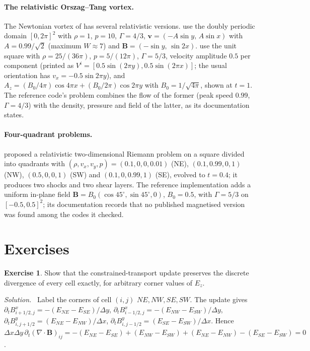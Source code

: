 \documentclass[11pt,a4paper,oneside,openany]{book}
\newcommand{\textcite}{\citet}
\theoremstyle{definition}
\newtheorem{exercise}{Exercise}[chapter]
\theoremstyle{plain}
\theoremstyle{remark}
\newenvironment{solution}{\par\smallskip\noindent\small\textit{Solution.}\ }{\par\medskip}
\newcommand{\vv}{\bm{v}}
\newcommand{\BB}{\bm{B}}
\begin{document}
\paragraph{The relativistic Orszag--Tang vortex.} The Newtonian vortex of
\textcite{OrszagTang1979} has several relativistic versions.
\textcite{vanderHolst2008} use the doubly periodic domain $[0,2\pi]^2$ with $\rho=1$,
$p=10$, $\Gamma=4/3$, $\vv=(-A\sin y,\,A\sin x)$ with $A=0.99/\sqrt2$ (maximum $W\approx7$)
and $\BB=(-\sin y,\,\sin2x)$. \textcite{BeckwithStone2011} use the unit square with
$\rho=25/(36\pi)$, $p=5/(12\pi)$, $\Gamma=5/3$, velocity amplitude $0.5$ per component
(printed as $V^i=[0.5\sin(2\pi y),0.5\sin(2\pi x)]$; the usual orientation has
$v_x=-0.5\sin2\pi y$), and $A_z=(B_0/4\pi)\cos4\pi x+(B_0/2\pi)\cos2\pi y$ with
$B_0=1/\sqrt{4\pi}$, shown at $t=1$. The reference code's problem combines the flow of the
former (peak speed $0.99$, $\Gamma=4/3$) with the density, pressure and field of the latter,
as its documentation states.

\paragraph{Four-quadrant problems.} \textcite{DelZannaBucciantini2002} proposed a relativistic
two-dimensional Riemann problem on a square divided into quadrants with
$(\rho,v_x,v_y,p)=(0.1,0,0,0.01)$ (NE), $(0.1,0.99,0,1)$ (NW), $(0.5,0,0,1)$ (SW) and
$(0.1,0,0.99,1)$ (SE), evolved to $t=0.4$; it produces two shocks and two shear layers.
The reference implementation adds a uniform in-plane field
$\BB=B_0(\cos45^\circ,\sin45^\circ,0)$, $B_0=0.5$, with $\Gamma=5/3$ on $[-0.5,0.5]^2$; its
documentation records that no published magnetised version was found among the codes it
checked.

\section*{Exercises}

\begin{exercise}\label{ex:ct}
Show that the constrained-transport update preserves the discrete divergence of every cell
exactly, for arbitrary corner values of $E_z$.
\end{exercise}
\begin{solution}
Label the corners of cell $(i,j)$ $NE,NW,SE,SW$. The update gives
$\partial_tB^x_{i+1/2,j}=-(E_{NE}-E_{SE})/\Delta y$, $\partial_tB^x_{i-1/2,j}=-(E_{NW}-E_{SW})/\Delta y$,
$\partial_tB^y_{i,j+1/2}=(E_{NE}-E_{NW})/\Delta x$, $\partial_tB^y_{i,j-1/2}=(E_{SE}-E_{SW})/\Delta x$.
Hence
$\Delta x\Delta y\,\partial_t(\nabla\cdot\BB)_{ij}=-(E_{NE}-E_{SE})+(E_{NW}-E_{SW})
+(E_{NE}-E_{NW})-(E_{SE}-E_{SW})=0$.
\end{solution}
\end{document}
